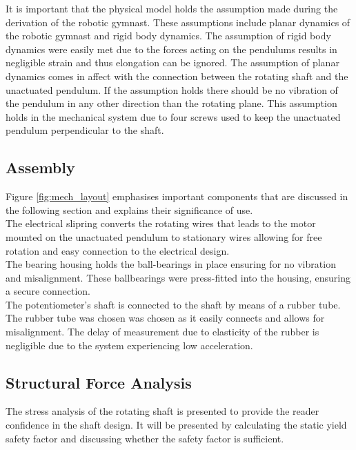 It is important that the physical model holds the assumption made during the derivation of the robotic gymnast. These assumptions include planar dynamics of the robotic gymnast and rigid body dynamics. The assumption of rigid body dynamics were easily met due to the forces acting on the pendulums results in negligible strain and thus elongation can be ignored. The assumption of planar dynamics comes in affect with the connection between the rotating shaft and the unactuated pendulum. If the assumption holds there should be no vibration of the pendulum in any other direction than the rotating plane. This assumption holds in the mechanical system due to four screws used to keep the unactuated pendulum perpendicular to the shaft. \\

\subsection{Assembly}
Figure \ref{fig:mech_layout} emphasises important components that are discussed in the following section and explains their significance of use.\\	

The electrical slipring converts the rotating wires that leads to the motor mounted on the unactuated pendulum to stationary wires allowing for free rotation and easy connection to the electrical design.\\

The bearing housing holds the ball-bearings in place ensuring for no vibration and misalignment. These ballbearings were press-fitted into the housing, ensuring a secure connection.\\

The potentiometer's shaft is connected to the shaft by means of a rubber tube. The rubber tube was chosen was chosen as it easily connects and allows for misalignment. The delay of measurement due to elasticity of the rubber is negligible due to the system experiencing low acceleration. \\


\subsection{Structural Force Analysis}
The stress analysis of the rotating shaft is presented to provide the reader confidence in the shaft design. It will be presented by calculating the static yield safety factor and discussing whether the safety factor is sufficient.\\

